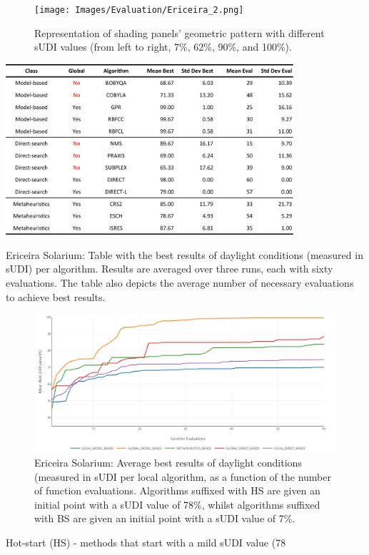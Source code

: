\begin{figure}
	\centering
	\texttt{[image: Images/Evaluation/Ericeira\_2.png]}
	\caption{Representation of shading panels’ geometric pattern with different sUDI values (from left to right, 7\%, 62\%, 90\%, and 100\%).}
	\label{fig:ericeira_multiple_panels}
\end{figure}

\begin{table}[htbp]
	\centering
	\includegraphics[width=0.8\textwidth]{tables_and_code/Ericeira_phase1_stats_v1.pdf}
	\caption[Ericeira Solarium: Table with best results and necessary evaluations per algorithm]{Ericeira Solarium: Table with the best results of daylight conditions (measured in \ac{sUDI}) per algorithm. Results are averaged over three runs, each with sixty evaluations. The table also depicts the average number of necessary evaluations to achieve best results.}
	\label{table:phase1results}
\end{table}


\begin{figure}[htbp]
	\centering
	\includegraphics[width=\textwidth]{Images/Evaluation/Ericeira_results_ph1_per_class.PNG}
	\caption[Ericeira Solarium: Average best results of daylight conditions (measured in \ac{sUDI} per local algorithm]{Ericeira Solarium: Average best results of daylight conditions (measured in \ac{sUDI} per local algorithm, as a function of the number of function evaluations. Algorithms suffixed with HS are given an initial point with a sUDI value of 78\%, whilst algorithms suffixed with BS are given an initial point with a sUDI value of 7\%.}
	\label{fig:phase2results}
\end{figure}
Hot-start (HS) - methods that start with a mild sUDI value (78%

